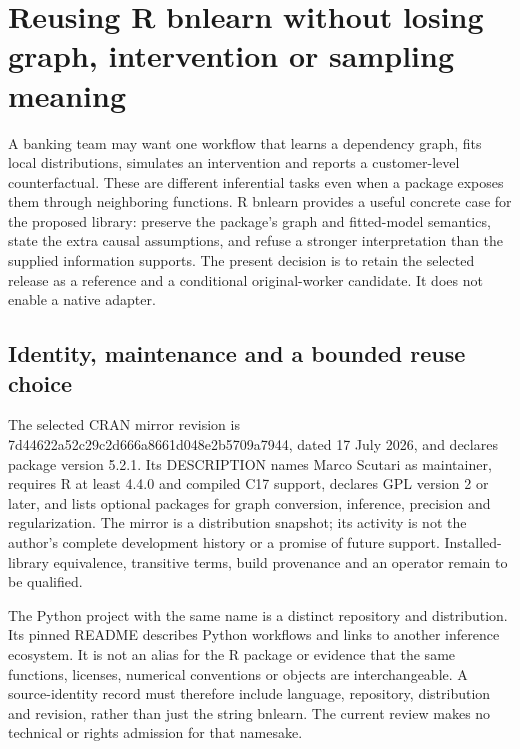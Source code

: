 \label{exec14:other-latent-end}


\section{Reusing R bnlearn without losing graph, intervention or sampling meaning}
\label{sec:exec24-bnlearn-reuse}
A banking team may want one workflow that learns a dependency graph, fits local distributions, simulates an intervention and reports a customer-level counterfactual. These are different inferential tasks even when a package exposes them through neighboring functions. R bnlearn provides a useful concrete case for the proposed library: preserve the package's graph and fitted-model semantics, state the extra causal assumptions, and refuse a stronger interpretation than the supplied information supports. The present decision is to retain the selected release as a reference and a conditional original-worker candidate. It does not enable a native adapter.~\citep{exec24_bnlearn_sources,exec24_bnlearn_contract}

\subsection{Identity, maintenance and a bounded reuse choice}
The selected CRAN mirror revision is 7d44622a52c29c2d666a8661d048e2b5709a7944, dated 17 July 2026, and declares package version 5.2.1. Its DESCRIPTION names Marco Scutari as maintainer, requires R at least 4.4.0 and compiled C17 support, declares GPL version 2 or later, and lists optional packages for graph conversion, inference, precision and regularization. The mirror is a distribution snapshot; its activity is not the author's complete development history or a promise of future support. Installed-library equivalence, transitive terms, build provenance and an operator remain to be qualified.~\citep{exec24_bnlearn_sources}

The Python project with the same name is a distinct repository and distribution. Its pinned README describes Python workflows and links to another inference ecosystem. It is not an alias for the R package or evidence that the same functions, licenses, numerical conventions or objects are interchangeable. A source-identity record must therefore include language, repository, distribution and revision, rather than just the string bnlearn. The current review makes no technical or rights admission for that namesake.~\citep{exec24_bnlearn_identity,exec24_bnlearn_contract}

